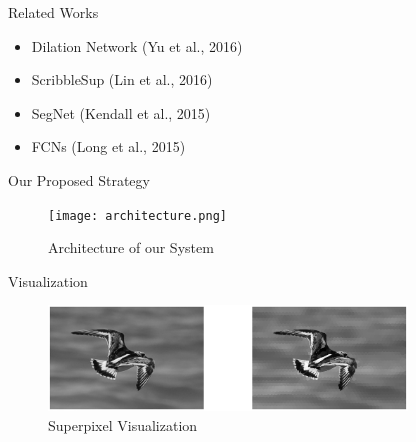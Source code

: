 \documentclass{beamer}
\begin{document}
	
	
	\begin{frame}{Related Works}
		\begin{block}{}
			\begin{itemize}
				\item Dilation Network (Yu et al., 2016)
				\item ScribbleSup (Lin et al., 2016)
				\item SegNet (Kendall et al., 2015)
				\item FCNs (Long et al., 2015)		
			\end{itemize}
		\end{block}
		
	\end{frame}
	
	
	
	\begin{frame}{Our Proposed Strategy}
	\begin{figure}[H]
		\begin{center}
			\texttt{[image: architecture.png]}
			\caption{Architecture of our System}
		\end{center}			
	\end{figure}
		
	\end{frame}
		
	
	
	\begin{frame}{Visualization}
		\begin{figure}[H]
			\begin{center}
				\includegraphics[width=0.85\textwidth]{superpixel_visualization.eps}
				\caption{Superpixel Visualization}
			\end{center}			
		\end{figure}

\end{frame}
\end{document}
